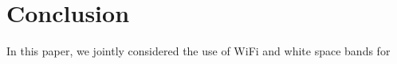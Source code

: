 \section{Conclusion}
\label{sec:conclusion}
In this paper, we jointly considered the use of WiFi and white space bands for 


